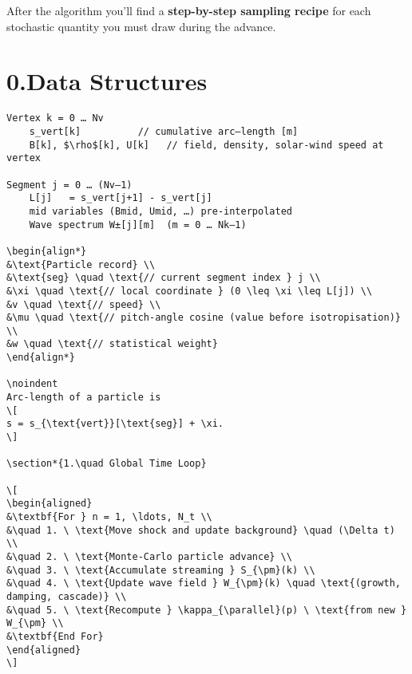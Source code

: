\noindent
After the algorithm you’ll find a \textbf{step-by-step sampling recipe} for each stochastic quantity you must draw during the advance.

\section*{0.\quad Data Structures}

\begin{verbatim}
Vertex k = 0 … Nv
    s_vert[k]          // cumulative arc–length [m]
    B[k], $\rho$[k], U[k]   // field, density, solar-wind speed at vertex

Segment j = 0 … (Nv–1)
    L[j]   = s_vert[j+1] - s_vert[j]
    mid variables (Bmid, Umid, …) pre-interpolated
    Wave spectrum W±[j][m]  (m = 0 … Nk–1)

\begin{align*}
&\text{Particle record} \\
&\text{seg} \quad \text{// current segment index } j \\
&\xi \quad \text{// local coordinate } (0 \leq \xi \leq L[j]) \\
&v \quad \text{// speed} \\
&\mu \quad \text{// pitch-angle cosine (value before isotropisation)} \\
&w \quad \text{// statistical weight}
\end{align*}

\noindent
Arc-length of a particle is
\[
s = s_{\text{vert}}[\text{seg}] + \xi.
\]

\section*{1.\quad Global Time Loop}

\[
\begin{aligned}
&\textbf{For } n = 1, \ldots, N_t \\
&\quad 1. \ \text{Move shock and update background} \quad (\Delta t) \\
&\quad 2. \ \text{Monte-Carlo particle advance} \\
&\quad 3. \ \text{Accumulate streaming } S_{\pm}(k) \\
&\quad 4. \ \text{Update wave field } W_{\pm}(k) \quad \text{(growth, damping, cascade)} \\
&\quad 5. \ \text{Recompute } \kappa_{\parallel}(p) \ \text{from new } W_{\pm} \\
&\textbf{End For}
\end{aligned}
\]


\end{verbatim}
